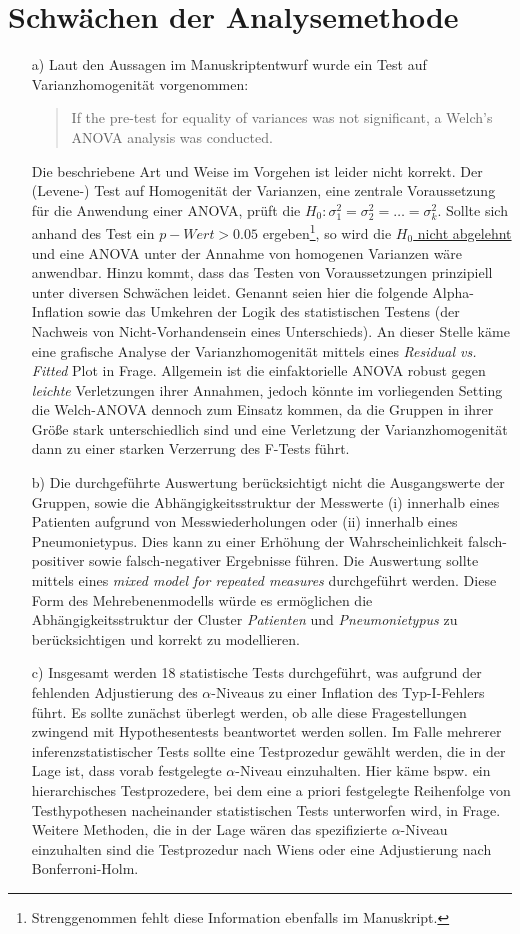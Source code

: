 \documentclass{scrartcl}
\theoremstyle{definition}
\theoremstyle{remark}
\begin{document}
\section{Schwächen der Analysemethode}
\begin{enumerate}
	\item[a) ]Laut den Aussagen im Manuskriptentwurf wurde ein Test auf Varianzhomogenität vorgenommen: 
	\begin{quotation}
		If the pre-test for equality of variances was not significant, a Welch's ANOVA analysis was conducted.
	\end{quotation}
	Die beschriebene Art und Weise im Vorgehen ist leider nicht korrekt. Der (Levene-) Test auf Homogenität der Varianzen, eine zentrale Voraussetzung für die Anwendung einer ANOVA, prüft die $H_0: \sigma^{2}_{1} = \sigma^{2}_{2} = \dots = \sigma^{2}_k$. Sollte sich anhand des Test ein $p-Wert>0.05$ ergeben\footnote{Strenggenommen fehlt diese Information ebenfalls im Manuskript.}, so wird die \underline{$H_0$ nicht abgelehnt} und eine ANOVA unter der Annahme von homogenen Varianzen wäre anwendbar. Hinzu kommt, dass das Testen von Voraussetzungen prinzipiell unter diversen Schwächen leidet. Genannt seien hier die folgende Alpha-Inflation sowie das Umkehren der Logik des statistischen Testens (der Nachweis von Nicht-Vorhandensein eines Unterschieds). An dieser Stelle käme eine grafische Analyse der Varianzhomogenität mittels eines \textit{Residual vs. Fitted} Plot in Frage. Allgemein ist die einfaktorielle ANOVA  robust gegen \textit{leichte} Verletzungen ihrer Annahmen, jedoch könnte im vorliegenden Setting die Welch-ANOVA  dennoch zum Einsatz kommen, da die Gruppen in ihrer Größe stark unterschiedlich sind und eine Verletzung der Varianzhomogenität dann zu einer starken Verzerrung des F-Tests führt.
	\item[b) ] Die durchgeführte Auswertung berücksichtigt nicht die Ausgangswerte der Gruppen, sowie die Abhängigkeitsstruktur der Messwerte (i) innerhalb eines Patienten aufgrund von Messwiederholungen oder (ii) innerhalb eines Pneumonietypus. Dies kann zu einer Erhöhung der Wahrscheinlichkeit falsch-positiver sowie falsch-negativer Ergebnisse führen. Die Auswertung sollte mittels eines  \textit{mixed model for repeated measures} durchgeführt werden. Diese Form des Mehrebenenmodells würde es ermöglichen die Abhängigkeitsstruktur der Cluster \textit{Patienten} und \textit{Pneumonietypus} zu berücksichtigen und korrekt zu modellieren.
	\item[c) ]Insgesamt werden 18 statistische Tests durchgeführt, was aufgrund der fehlenden Adjustierung des $\alpha$-Niveaus zu einer Inflation des Typ-I-Fehlers führt. Es sollte zunächst überlegt werden, ob alle diese Fragestellungen zwingend mit Hypothesentests beantwortet werden sollen. Im Falle mehrerer inferenzstatistischer Tests sollte eine Testprozedur gewählt werden, die in der Lage ist, dass vorab festgelegte $\alpha$-Niveau einzuhalten. Hier käme bspw. ein hierarchisches Testprozedere, bei dem eine a priori festgelegte Reihenfolge von Testhypothesen nacheinander statistischen Tests unterworfen wird, in Frage. Weitere Methoden, die in der Lage wären das spezifizierte $\alpha$-Niveau einzuhalten sind die Testprozedur nach Wiens oder eine Adjustierung nach Bonferroni-Holm.

\end{enumerate}
\end{document}
